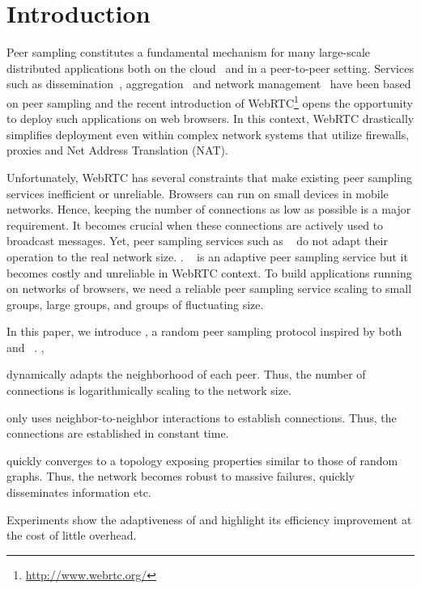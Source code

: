 
\section{Introduction}

Peer sampling constitutes a fundamental mechanism for many large-scale
distributed applications both on the
cloud~\cite{decandia2007dynamo} and in a peer-to-peer
setting. Services such as dissemination~\cite{eugster2003lightweight,
  tolgyeski2009adaptive}, aggregation~\cite{jelasity2004epidemic} and
network management~\cite{jelasity2009tman, voulgaris2005epidemic} have
been based on peer sampling and the recent introduction of
WebRTC\footnote{\url{http://www.webrtc.org/}} opens the opportunity to
deploy such applications on web browsers.
In this context, WebRTC drastically simplifies deployment even within complex
network systems that utilize firewalls, proxies and Net Address Translation
(NAT).

Unfortunately, WebRTC has several constraints that make existing peer sampling
services inefficient or unreliable. Browsers can run on small devices in mobile
networks. Hence, keeping the number of connections as low as possible is a major
requirement. It becomes crucial when these connections are actively used to
broadcast messages. Yet, peer sampling services such as
\CYCLON~\cite{voulgaris2005cyclon} do not adapt their operation to the real
network size. . \SCAMP~\cite{ganesh2003peer} is an adaptive peer sampling service but
it becomes costly and unreliable in WebRTC context. To build applications
running on networks of browsers, we need a reliable peer sampling service
scaling to small groups, large groups, and groups of fluctuating size.

In this paper, we introduce \SPRAY, a random peer sampling protocol inspired by
both \SCAMP~\cite{ganesh2003peer}
and \CYCLON~\cite{voulgaris2005cyclon}. ,
\begin{inparaenum}[(i)]
\item \SPRAY dynamically adapts the neighborhood of each peer. Thus, the number
  of connections is logarithmically scaling to the network size.
\item \SPRAY only uses neighbor-to-neighbor interactions to establish
  connections. Thus, the connections are established in constant time.
\item \SPRAY quickly converges to a topology exposing properties similar to
  those of random graphs. Thus, the network becomes robust to massive failures,
  quickly disseminates information etc.
\item Experiments show the adaptiveness of \SPRAY and highlight its efficiency
  improvement at the cost of little overhead.
\end{inparaenum}

